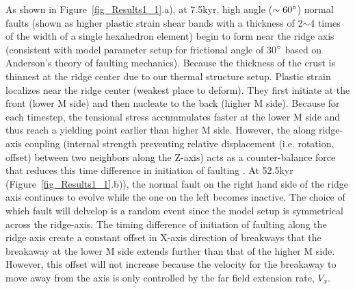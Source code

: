 
As shown in Figure~\ref{fig_Results1_1}.a), at 7.5kyr, high angle ($\sim 60 \degree$) normal faults (shown as higher plastic strain shear bands with a thickness of 2$\sim$4 times of the width of a single hexahedron element) begin to form near the ridge axis (consistent with model parameter setup for frictional angle of 30$\degree$ based on Anderson's theory of faulting mechanics). Because the thickness of the crust is thinnest at the ridge center due to our thermal structure setup. Plastic strain localizes near the ridge center (weakest place to deform). They first initiate at the front (lower M side) and then nucleate to the back (higher M side). Because for each timestep, the tensional stress accummulates faster at the lower M side and thus reach a yielding point earlier than higher M side. However, the along ridge-axis coupling (internal strength preventing relative displacement (i.e. rotation, offset) between two neighbors along the Z-axis) acts as a counter-balance force that reduces this time difference in initiation of faulting .  At 52.5kyr (Figure~\ref{fig_Results1_1}.b)), the normal fault on the right hand side of the ridge axis continues to evolve while the one on the left becomes inactive. The choice of which fault will delvelop is a random event since the model setup is symmetrical across the ridge-axis. The timing difference of initiation of faulting along the ridge axis create a constant offset in X-axis direction of breakways that the breakaway at the lower M side extends further than that of the higher M side. However, this offset will not increase because the velocity for the breakaway to move away from the axis is only controlled by the far field extension rate, $V_{x}$. 

